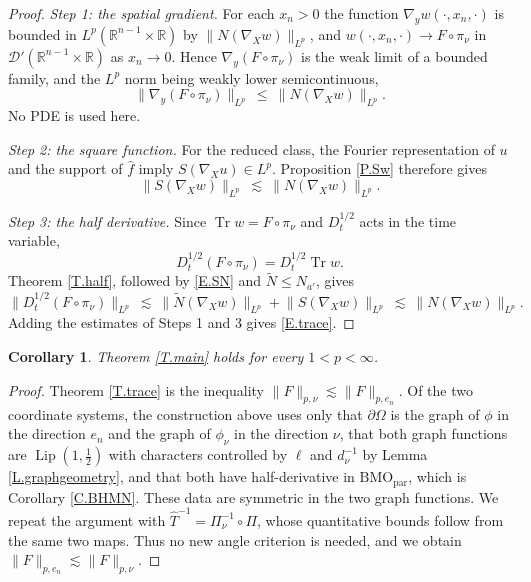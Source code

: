 \documentclass[12pt,leqno]{amsart}
\numberwithin{equation}{section}
\DeclareMathOperator{\Lip}{Lip}
\newcommand{\R}{\mathbb R}
\newcommand{\wh}{\widehat}
\newcommand{\br}[1]{\left(#1\right)}
\newcommand{\pom}{\partial\Omega}
\newcommand{\dhalf}{D_t^{1/2}}
\newcommand{\BMOpar}{\mathrm{BMO}_{\mathrm{par}}}
\newcommand{\Nt}{\widetilde N}
\theoremstyle{plain}
\newtheorem{corollary}[equation]{Corollary}
\theoremstyle{remark}
\begin{document}
\begin{proof}
\noindent\emph{Step 1: the spatial gradient.} For each $x_n>0$ the function
$\nabla_yw(\cdot,x_n,\cdot)$ is bounded in $L^p(\R^{n-1}\times\R)$ by
$\|N(\nabla_Xw)\|_{L^p}$, and $w(\cdot,x_n,\cdot)\to F\circ\pi_\nu$ in
$\mathcal D'(\R^{n-1}\times\R)$ as $x_n\to0$. Hence
$\nabla_y(F\circ\pi_\nu)$ is the weak limit of a bounded family, and the $L^p$
norm being weakly lower semicontinuous,
$$\big\|\nabla_y\br{F\circ\pi_\nu}\big\|_{L^p}\ \le\
  \big\|N(\nabla_Xw)\big\|_{L^p} .$$
No PDE is used here.\medskip

\noindent\emph{Step 2: the square function.} For the reduced class, the
Fourier representation of $u$ and the support of $\wh f$ imply
$S(\nabla_Xu)\in L^p$. Proposition \ref{P.Sw} therefore gives
\begin{equation}\label{E.SN}
  \big\|S(\nabla_Xw)\big\|_{L^p}\ \lesssim\ \big\|N(\nabla_Xw)\big\|_{L^p} .
\end{equation}

\noindent\emph{Step 3: the half derivative.} Since
$\operatorname{Tr}w=F\circ\pi_\nu$ and $\dhalf$ acts in the time variable,
$$\dhalf\br{F\circ\pi_\nu}=\dhalf\operatorname{Tr}w.$$
Theorem \ref{T.half}, followed by \eqref{E.SN} and $\Nt\le N_{a'}$, gives
$$\big\|\dhalf\br{F\circ\pi_\nu}\big\|_{L^p}\ \lesssim\
  \big\|\Nt(\nabla_Xw)\big\|_{L^p}+\big\|S(\nabla_Xw)\big\|_{L^p}
  \ \lesssim\ \big\|N(\nabla_Xw)\big\|_{L^p} .$$
Adding the estimates of Steps 1 and 3 gives \eqref{E.trace}.
\end{proof}

\begin{corollary}\label{C.frame}
Theorem \ref{T.main} holds for every $1<p<\infty$.
\end{corollary}

\begin{proof}
Theorem \ref{T.trace} is the inequality $\|F\|_{p,\nu}\lesssim\|F\|_{p,e_n}$.
Of the two coordinate systems, the construction above uses only that $\pom$ is
the graph of $\phi$ in the direction $e_n$ and the graph of $\phi_\nu$ in the
direction $\nu$, that both graph functions are $\Lip(1,\tfrac12)$ with
characters controlled by $\ell$ and $d_\nu^{-1}$ by Lemma
\ref{L.graphgeometry}, and that both have
half-derivative in $\BMOpar$, which is Corollary \ref{C.BHMN}. These data are
symmetric in the two graph functions. We repeat the argument with
$\widehat T^{-1}=\Pi_\nu^{-1}\circ\Pi$, whose quantitative bounds follow from
the same two maps. Thus no new angle criterion is needed, and we obtain
$\|F\|_{p,e_n}\lesssim\|F\|_{p,\nu}$.
\end{proof}
\end{document}
